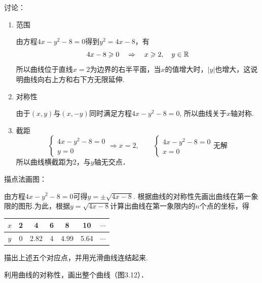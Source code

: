 \begin{solution}
讨论：
\begin{enumerate}[(1)]
    \item 范围

    由方程$4x-y^2-8=0$得到$y^2=4x-8$，有
   \[ 4x-8\geqslant 0 \quad \Rightarrow\quad x\geqslant 2,\quad y\in\mathbb{R}\]
    所以曲线位于直线$x=2$为边界的右半平面，当$x$的值增大时，$|y|$也增大，这说明曲线向右上方和右下方无限延伸.
    \item 对称性
    
    由于$(x,y)$与$(x,-y)$同时满足方程$4x-y^2-8=0$, 所以曲线关于$x$轴对称.
    \item 截距
\[\begin{cases}
    4x-y^2-8=0\\y=0
\end{cases}\Rightarrow x=2,\qquad \begin{cases}
    4x-y^2-8=0\\x=0
\end{cases}\text{无解}\]    
所以曲线横截距为2，与$y$轴无交点．
\end{enumerate}

    描点法画图：

    \begin{enumerate}[(i)]
\noindent
\begin{minipage}{.48\textwidth}
\item 由方程$4x-y^2-8=0$可得$y=\pm\sqrt{4x-8}$. 根据曲线的对称性先画出曲线在第一象限的图形.为此，根据$y=\sqrt{4x-8}$计算出曲线在第一象限内的$n$个点的坐标，得
    \begin{center}
\begin{tabular}{c|cccccc}
\hline    
    $x$ &2&4&6&8&10&$\cdots$\\
\hline    
$y$&0&2.82&4&4.99&5.64&$\cdots$\\
\hline    
\end{tabular}
\end{center}

\item 描出上述五个对应点，并用光滑曲线连结起来.
\end{minipage}
\hfill
\begin{minipage}{.45\textwidth}
\centering
{}
\end{minipage}

\item 利用曲线的对称性，画出整个曲线（图3.12）．
\end{enumerate}
\end{solution}





